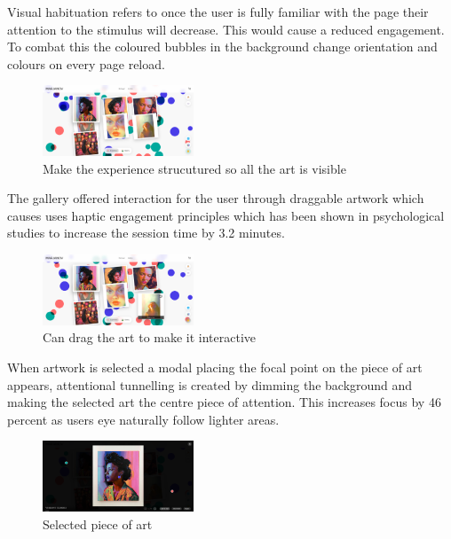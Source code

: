 \documentclass[]{project_final}
\begin{document}
Visual habituation refers to once the user is fully familiar with the page their attention to the stimulus will decrease. This would cause a reduced engagement. To combat this the coloured bubbles in the background change orientation and colours on every page reload.

\begin{figure}[ht!]
    \centering
    \includegraphics[width=0.4\textwidth]{AG29.png}
    \vspace*{0.0cm}
    \caption{Make the experience strucutured so all the art is visible}
    \label{fig:1}
\end{figure}

The gallery offered interaction for the user through draggable artwork which causes uses haptic engagement principles which has been shown in psychological studies to increase the session time by 3.2 minutes.

\begin{figure}[ht!]
    \centering
    \includegraphics[width=0.4\textwidth]{AG30.png}
    \vspace*{0.0cm}
    \caption{Can drag the art to make it interactive}
    \label{fig:1}
\end{figure}

When artwork is selected a modal placing the focal point on the piece of art appears, attentional tunnelling is created by dimming the background and making the selected art the centre piece of attention. This increases focus by 46 percent as users eye naturally follow lighter areas.

\begin{figure}[ht!]
    \centering
    \includegraphics[width=0.4\textwidth]{AG31.png}
    \vspace*{0.0cm}
    \caption{Selected piece of art}
    \label{fig:1}
\end{figure}
\end{document}
